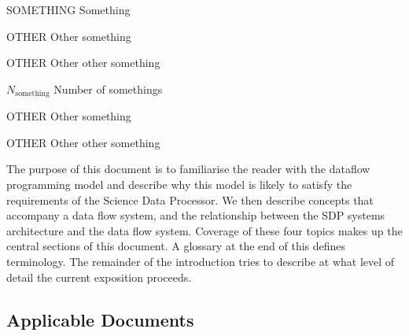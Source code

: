 \documentclass[11pt,a4paper]{article}
\begin{document}
\sdpfrontpage

\sdptableofcontents

\sdplistofabbreviations
\begin{basedescript}{\desclabelstyle{\pushlabel}\desclabelwidth{6em}}
    \item[SOMETHING] Something \vspace{-0.2cm}
    \item[OTHER] Other something \vspace{-0.2cm}
    \item[OTHER] Other other something \vspace{-0.2cm}
\end{basedescript} 

\sdplistofsymbols
\begin{basedescript}{\desclabelstyle{\pushlabel}\desclabelwidth{6em}}
    \item[$N_\mathrm{something}$] Number of somethings \vspace{-0.2cm}
    \item[OTHER] Other something \vspace{-0.2cm}
    \item[OTHER] Other other something \vspace{-0.2cm}
\end{basedescript} 


\sdplistoffigures

\sdplistoftables

\sdpsummary

The purpose of this document is to familiarise the reader with the
dataflow programming model and describe why this model is likely to
satisfy the requirements of the Science Data Processor. We then
describe concepts that accompany a data flow system, and the
relationship between the SDP systems architecture and the data flow
system.  Coverage of these four topics makes up the central sections
of this document.  A glossary at the end of this defines terminology.
The remainder of the introduction tries to describe at what level of
detail the current exposition proceeds.

\sdpreferencedocs

\subsection*{Applicable Documents}
\end{document}
